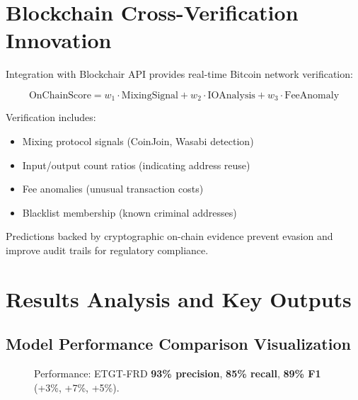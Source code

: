 \documentclass[10pt,conference,compsociety]{IEEEtran}
\begin{document}
\section{Blockchain Cross-Verification Innovation}

Integration with Blockchair API provides real-time Bitcoin network verification:

\[
\text{OnChainScore} = w_1 \cdot \text{MixingSignal} + w_2 \cdot \text{IOAnalysis} + w_3 \cdot \text{FeeAnomaly}
\]

Verification includes:
\begin{itemize}
    \item Mixing protocol signals (CoinJoin, Wasabi detection)
    \item Input/output count ratios (indicating address reuse)
    \item Fee anomalies (unusual transaction costs)
    \item Blacklist membership (known criminal addresses)
\end{itemize}

Predictions backed by cryptographic on-chain evidence prevent evasion and improve audit trails for regulatory compliance.

\section{Results Analysis and Key Outputs}

\subsection{Model Performance Comparison Visualization}

\begin{figure}[htbp]
\centering
{}
\caption{Performance: ETGT-FRD \textbf{93\% precision}, \textbf{85\% recall}, \textbf{89\% F1} (+3\%, +7\%, +5\%).}
\label{fig:performance}
\end{figure}
\end{document}
